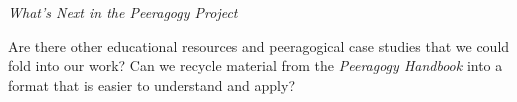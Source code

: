 
\begin{framed}
\noindent 
\emph{What's Next in the Peeragogy Project}
\begin{collectinmacro}{\ReduceWN}{}{}
Are there other educational resources and peeragogical case studies
that we could fold into our work?  Can we recycle material from the
\emph{Peeragogy Handbook} into a format that is easier to understand
and apply?
\end{collectinmacro}
\ReduceWN
\end{framed}

